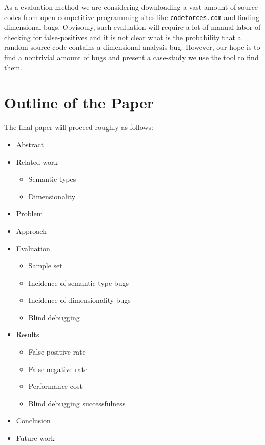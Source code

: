 \documentclass[12pt]{article}
\begin{document}
As a evaluation method we are considering downloading a vast amount of source codes from open competitive programming sites like \texttt{codeforces.com} and finding dimensional bugs. Obvisouly, such evaluation will require a lot of manual labor of checking for false-positives and it is not clear what is the probability that a random source code contains a dimensional-analysis bug. However, our hope is to find a nontrivial amount of bugs and present a case-study we use the tool to find them.

\section{Outline of the Paper}

The final paper will proceed roughly as follows:

\begin{itemize}
\item Abstract
\item Related work
\begin{itemize}
	\item Semantic types
	\item Dimensionality
\end{itemize}
\item Problem
\item Approach
\item Evaluation
\begin{itemize}
	\item Sample set
	\item Incidence of semantic type bugs
	\item Incidence of dimensionality bugs
	\item Blind debugging
\end{itemize}
\item Results
\begin{itemize}
	\item False positive rate
	\item False negative rate
	\item Performance cost
	\item Blind debugging successfulness
\end{itemize}
\item Conclusion
\item Future work
\end{itemize}




\end{document}
